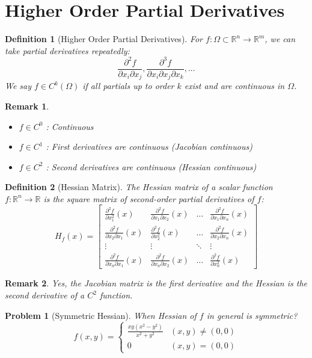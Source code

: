\documentclass{article}
\newtheorem{definition}{Definition}
\newtheorem{problem}{Problem}
\newtheorem{remark}{Remark}
\begin{document}
\section{Higher Order Partial Derivatives}
\begin{definition}[Higher Order Partial Derivatives]
    For \(f : \Omega \subset \mathbb{R}^n \to \mathbb{R}^m\), we can take partial derivatives repeatedly:
    \[\frac{\partial^2 f}{\partial x_i \partial x_j}, \frac{\partial^3 f}{\partial x_i \partial x_j \partial x_k},...\]
    We say \(f \in C^k(\Omega)\) if all partials up to order \(k\) exist and are continuous in \(\Omega\).
\end{definition}
\begin{remark}
    \begin{itemize}
        \item \(f \in C^0\) : Continuous
        \item \(f \in C^1\) : First derivatives are continuous (Jacobian continuous)
        \item \(f \in C^2\) : Second derivatives are continuous (Hessian continuous)
    \end{itemize}
\end{remark}

\begin{definition}[Hessian Matrix]
    The Hessian matrix of a scalar function \(f : \mathbb{R}^n \to \mathbb{R}\) is the square matrix of second-order partial derivatives of \(f\):
    \[H_f(x) = \begin{bmatrix}
    \frac{\partial^2 f}{\partial x_1^2}(x) & \frac{\partial^2 f}{\partial x_1 \partial x_2}(x) & \ldots & \frac{\partial^2 f}{\partial x_1 \partial x_n}(x) \\
    \frac{\partial^2 f}{\partial x_2 \partial x_1}(x) & \frac{\partial^2 f}{\partial x_2^2}(x) & \ldots & \frac{\partial^2 f}{\partial x_2 \partial x_n}(x) \\
    \vdots & \vdots & \ddots & \vdots \\
    \frac{\partial^2 f}{\partial x_n \partial x_1}(x) & \frac{\partial^2 f}{\partial x_n \partial x_2}(x) & \ldots & \frac{\partial^2 f}{\partial x_n^2}(x)
    \end{bmatrix}\]
\end{definition}
\begin{remark}
    Yes, the Jacobian matrix is the first derivative and the Hessian is the second derivative of a \(C^2\) function.
\end{remark}

\begin{problem}[Symmetric Hessian]
    When Hessian of \(f\) in general is symmetric?
    \[f(x,y) = \begin{cases} \frac{xy(x^2 - y^2)}{x^2 + y^2} & (x,y) \neq (0,0) \\ 0 & (x,y) = (0,0) \end{cases}\]
\end{problem}
\end{document}
